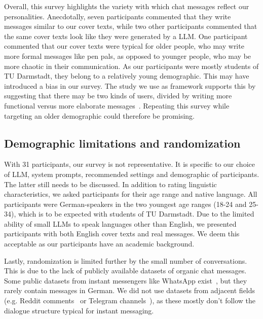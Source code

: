 Overall, this survey highlights the variety with which chat messages reflect our personalities. Anecdotally, seven participants commented that they write messages similar to our cover texts, while two other participants commented that the same cover texts look like they were generated by a \gls{LLM}. One participant commented that our cover texts were typical for older people, who may write more formal messages like pen pals, as opposed to younger people, who may be more chaotic in their communication. As our participants were mostly students of TU Darmstadt, they belong to a relatively young demographic. This may have introduced a bias in our survey. The study we use as framework supports this by suggesting that there may be two kinds of users, divided by writing more functional versus more elaborate messages~\cite{alazzawieLinguisticSituationalFeatures2022}. Repeating this survey while targeting an older demographic could therefore be promising.

\subsection{Demographic limitations and randomization}
\label{sec:demographicLimitationsAndRandomization}
With 31 participants, our survey is not representative. It is specific to our choice of \gls{LLM}, system prompts, recommended settings and demographic of participants. The latter still needs to be discussed. In addition to rating linguistic characteristics, we asked participants for their age range and native language. All participants were German-speakers in the two youngest age ranges (18-24 and 25-34), which is to be expected with students of TU Darmstadt. Due to the limited ability of small \glspl{LLM} to speak languages other than English, we presented participants with both English cover texts and real messages. We deem this acceptable as our participants have an academic background.

Lastly, randomization is limited further by the small number of conversations. This is due to the lack of publicly available datasets of organic chat messages. Some public datasets from instant messengers like WhatsApp exist~\cite{ueberwasserWhatsSwitzerlandCorpusbased2017}, but they rarely contain messages in German. We did not use datasets from adjacent fields (e.g. Reddit comments~\cite{baumgartnerPushshiftRedditDataset2020} or Telegram channels~\cite{morgiaTGDatasetCollectingExploring2025}), as these mostly don't follow the dialogue structure typical for instant messaging.
